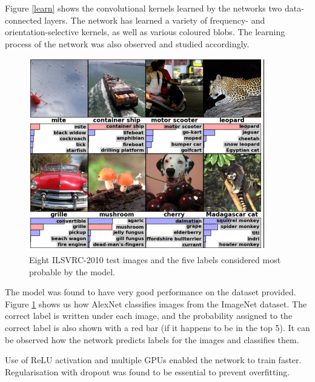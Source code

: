 \documentclass[11pt]{report}
\begin{document}
Figure \ref{learn} shows the convolutional kernels learned by the networks two data-connected layers. The
network has learned a variety of frequency- and orientation-selective kernels, as well as various coloured blobs. The learning process of the network was also observed and studied accordingly.


\begin{figure}[!h]
	\includegraphics[scale=0.85]{result.png}
	\centering 
	\caption{Eight ILSVRC-2010 test images and the five labels considered most probable by the model.}
	\label{result}
\end{figure}

The model was found to have very good performance on the dataset provided.\citep{one} Figure \ref{result} shows us how AlexNet classifies images from the ImageNet dataset. The correct label is written under each image, and the probability assigned to the correct label is also shown with a red bar (if it happens to be in the top 5). It can be observed how the network predicts labels for the images and classifies them.

 Use of ReLU activation and multiple GPUs enabled the network to train faster. Regularisation with dropout was found to be essential to prevent overfitting.
%
%
\end{document}
